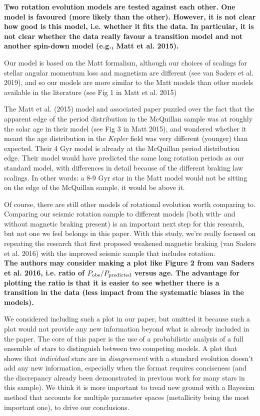 \documentclass[11pt]{article}
\begin{document}
\noindent\textbf{ Two rotation evolution models are tested against each other. One model is favoured (more likely than the other). However, it is not clear how good is this model, i.e. whether it fits the data. In particular, it is not clear whether the data really favour a transition model and not another spin-down model (e.g., Matt et al. 2015).}

Our model is based on the Matt formalism, although our choices of scalings for stellar angular momentum loss and magnetism are different (see van Saders et al. 2019), and so our models are more similar to the Matt models than other models available in the literature (see Fig 1 in Matt et al. 2015) 

The Matt et al. (2015) model and associated paper puzzled over the fact that the apparent edge of the period distribution in the McQuillan sample was at roughly the solar age in their model (see Fig 3 in Matt 2015), and wondered whether it meant the age distribution in the \textit{Kepler} field was very different (younger) than expected. Their 4 Gyr model is already at the McQuillan period distribution edge. Their model would have predicted the same long rotation periods as our standard model, with differences in detail because of the different braking law scalings. In other words: a 8-9 Gyr star in the Matt model would not be sitting on the edge of the McQuillan sample, it would be above it.

Of course, there are still other models of rotational evolution worth comparing to. Comparing our seismic rotation sample to different models (both with- and without magnetic braking present) is an important next step for this research, but not one we feel belongs in this paper. With this study, we’re really focused on repeating the research that first proposed weakened magnetic braking (van Saders et al. 2016) with the improved seismic sample that includes rotation.\\

\noindent\textbf{The authors may consider making a plot like Figure 2 from van Saders et al. 2016, i.e. ratio of $P_{\rm obs}/P_{\rm predicted}$ versus age. The advantage for plotting the ratio is that it is easier to see whether there is a transition in the data (less impact from the systematic biases in the models).}

We considered including such a plot in our paper, but omitted it because such a plot would not provide any new information beyond what is already included in the paper. The core of this paper is the use of a probabilistic analysis of a full ensemble of stars to distinguish between two competing models. A plot that shows that \textit{individual} stars are in \textit{disagreement} with a standard evolution doesn’t add any new information, especially when the format requires conciseness (and the discrepancy already been demonstrated in previous work for many stars in this sample). We think it is more important to tread new ground with a Bayesian method that accounts for multiple parameter spaces (metallicity being the most important one), to drive our conclusions.
\end{document}
